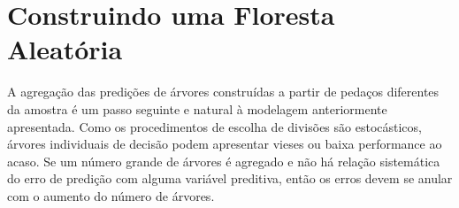 

 
 \section{Construindo uma Floresta Aleatória}
 
 A agregação das predições de árvores construídas a partir de pedaços diferentes da amostra é um passo seguinte e natural à modelagem anteriormente apresentada. Como os procedimentos de escolha de divisões são estocásticos, árvores individuais de decisão podem apresentar vieses ou baixa performance ao acaso. Se um número grande de árvores é agregado e não há relação sistemática do erro de predição com alguma variável preditiva, então os erros devem se anular com o aumento do número de árvores.
 
  
  
